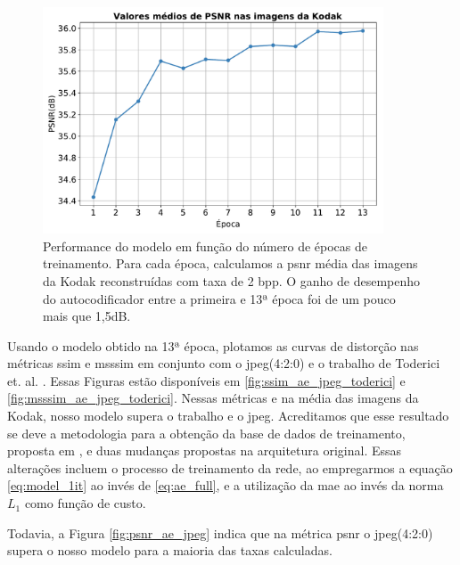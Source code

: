 \begin{figure}
	\centering
	\includegraphics[width=0.9\textwidth]{figuras/psnr_13epochs.pdf}
	\caption[Performance do modelo em função do número de épocas de treinamento]{Performance do modelo em função do número de épocas de treinamento. Para cada época, calculamos a \acrshort{psnr} média das imagens da Kodak reconstruídas com taxa de 2 bpp.  O ganho de desempenho do autocodificador entre a primeira e 13ª época foi de um pouco mais que 1,5dB.}
	\label{fig:psnr_13epocas}
\end{figure}		

Usando o modelo obtido na 13ª época, plotamos as curvas de distorção nas métricas \acrshort{ssim} e \acrshort{msssim} em conjunto com o \acrshort{jpeg}(4:2:0) e o trabalho de Toderici et. al. \cite{FullResolution2017Toderici}. Essas Figuras estão disponíveis em \ref{fig:ssim_ae_jpeg_toderici} e  \ref{fig:msssim_ae_jpeg_toderici}. 
Nessas métricas e na média das imagens da Kodak, nosso modelo supera o trabalho \cite{FullResolution2017Toderici} e o \acrshort{jpeg}. Acreditamos que esse resultado se deve a metodologia para a obtenção da base de dados de treinamento, proposta em \cite{DeliverableJuly}, e duas mudanças propostas na arquitetura original. Essas alterações incluem o processo de treinamento da rede, ao empregarmos a equação \ref{eq:model_1it} ao invés de \ref{eq:ae_full}, e a utilização da \acrshort{mae} ao invés da norma \textit{$L_1$} como função de custo.  


Todavia, a Figura \ref{fig:psnr_ae_jpeg} indica que na métrica \acrshort{psnr} o \acrshort{jpeg}(4:2:0) supera o nosso modelo para a maioria das taxas calculadas. 

